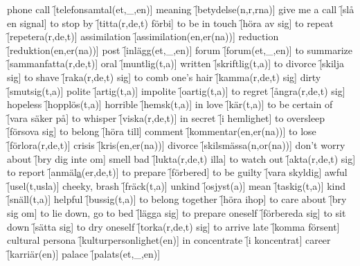 \begin{questions}
\begin{multicols}{2}
        \question phone call \f[telefonsamtal(et,\_,en)]
        \question meaning \f[betydelse(n,r,rna)]
        \question give me a call \f[slå en signal]
        \question to stop by \f[titta(r,de,t) förbi]
        \question to be in touch \f[höra av sig]
        \question to repeat \f[repetera(r,de,t)]
        \question assimilation \f[assimilation(en,er(na))]
        \question reduction \f[reduktion(en,er(na))]
        \question post \f[inlägg(et,\_,en)]
        \question forum \f[forum(et,\_,en)]
        \question to summarize \f[sammanfatta(r,de,t)]
        \question oral \f[muntlig(t,a)]
        \question written \f[skriftlig(t,a)]
        \question to divorce \f[skilja sig]
        \question to shave \f[raka(r,de,t) sig]
        \question to comb one's hair \f[kamma(r,de,t) sig]
        \question dirty \f[smutsig(t,a)]
        \question polite \f[artig(t,a)]
        \question impolite \f[oartig(t,a)]
        \question to regret \f[ångra(r,de,t) sig]
        \question hopeless \f[hopplös(t,a)]
        \question horrible \f[hemsk(t,a)]
        \question in love \f[kär(t,a)]
        \question to be certain of \f[vara säker på]
        \question to whisper \f[viska(r,de,t)]
        \question in secret \f[i hemlighet]
        \question to oversleep \f[försova sig]
        \question to belong \f[höra till]
        \question comment \f[kommentar(en,er(na))]
        \question to lose \f[förlora(r,de,t)]
        \question crisis \f[kris(en,er(na))]
        \question divorce \f[skilsmässa(n,or(na))]
        \question don't worry about \f[bry dig inte om]
        \question smell bad \f[lukta(r,de,t) illa]
        \question to watch out \f[akta(r,de,t) sig]
        \question to report \f[anmäl\underline{a}(er,de,t)]
        \question to prepare \f[förbered]
        \question to be guilty \f[vara skyldig]
        \question awful \f[usel(t,usla)]
        \question cheeky, brash \f[fräck(t,a)]
        \question unkind \f[osjyst(a)]
        \question mean \f[taskig(t,a)]
        \question kind \f[snäll(t,a)]
        \question helpful \f[bussig(t,a)]
        \question to belong together \f[höra ihop]
        \question to care about \f[bry sig om]
        \question to lie down, go to bed \f[lägga sig]
        \question to prepare oneself \f[förbereda sig]
        \question to sit down \f[sätta sig]
        \question to dry oneself \f[torka(r,de,t) sig]
        \question to arrive late \f[komma försent]
        \question cultural persona \f[kulturpersonlighet(en)]
        \question in concentrate \f[i koncentrat]
        \question career \f[karriär(en)]
        \question palace \f[palats(et,\_,en)]

\end{multicols}
\end{questions}
